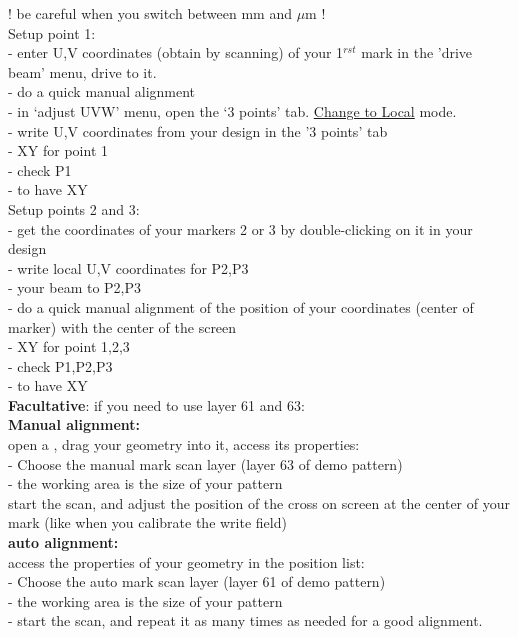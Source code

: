 ! be careful when you switch between mm and $\mu$m !\\

Setup point 1:\\
- enter U,V coordinates (obtain by scanning) of your 1$^{rst}$ mark in the 'drive beam' menu, drive to it.\\
- do a quick manual alignment\\
- in `adjust UVW' menu, open the `3 points' tab. \underline{Change to Local} mode.\\
- write U,V coordinates from your design in the '3 points' tab\\
-  XY for point 1\\
- check P1\\
-  to have XY\\


Setup points 2 and 3:\\
- get the coordinates of your markers 2 or 3 by double-clicking on it in your design\\
- write local U,V coordinates for P2,P3\\
-  your beam to P2,P3\\
- do a quick manual alignment of the position of your coordinates (center of marker) with the center of the screen\\
-  XY for point 1,2,3\\
- check P1,P2,P3\\
-  to have XY\\

\textbf{Facultative}: if you need to use layer 61 and 63:\\

\textbf{Manual alignment:}\\
open a , drag your geometry into it, access its properties:\\
- Choose the manual mark scan layer (layer 63 of demo pattern)\\
- the working area is the size of your pattern\\

start the scan, and adjust the position of the cross on screen at the center of your mark (like when you calibrate the write field)\\

\textbf{auto alignment:}\\
access the properties of your geometry in the position list:\\
- Choose the auto mark scan layer (layer 61 of demo pattern)\\
- the working area is the size of your pattern\\
- start the scan, and repeat it as many times as needed for a good alignment.\\

